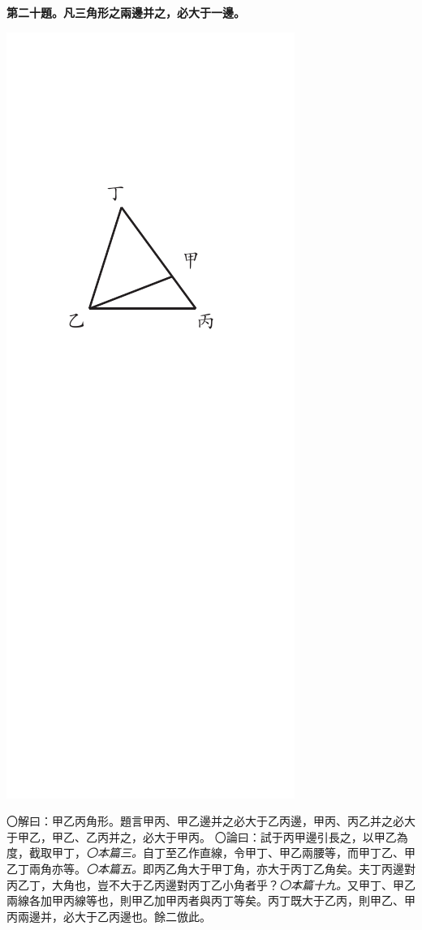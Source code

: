 \documentclass[12pt,b5paper,landscape]{article}
\newcommand{\ccom}[1]{{\footnotesize \emph{〇#1}}}
\newcommand{\bcom}[1]{〇#1}
\newcommand{\cthm}[1]{{
\vspace{8pt}

\bfseries #1}}
\begin{document}
\begin{multicols}{2}
\cthm{第二十題。凡三角形之兩邊并之，必大于一邊。}
\begin{center}
    \includegraphics[angle=90]{eu65}  
\end{center}
\bcom{解曰：甲乙丙角形。題言甲丙、甲乙邊并之必大于乙丙邊，甲丙、丙乙并之必大于甲乙，甲乙、乙丙并之，必大于甲丙。}
\bcom{論曰：試于丙甲邊引長之，以甲乙為度，截取甲丁，\ccom{本篇三。}自丁至乙作直線，令甲丁、甲乙兩腰等，而甲丁乙、甲乙丁兩角亦等。\ccom{本篇五。}即丙乙角大于甲丁角，亦大于丙丁乙角矣。夫丁丙邊對丙乙丁，大角也，豈不大于乙丙邊對丙丁乙小角者乎？\ccom{本篇十九。}又甲丁、甲乙兩線各加甲丙線等也，則甲乙加甲丙者與丙丁等矣。丙丁既大于乙丙，則甲乙、甲丙兩邊并，必大于乙丙邊也。餘二倣此。}


\end{multicols}
\end{document}
